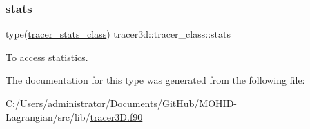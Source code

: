 \subsubsection{\texorpdfstring{stats}{stats}}
{\footnotesize\ttfamily type(\mbox{\hyperlink{structtracer3d_1_1tracer__stats__class}{tracer\+\_\+stats\+\_\+class}}) tracer3d\+::tracer\+\_\+class\+::stats\hspace{0.3cm}{\ttfamily [private]}}



To access statistics. 



The documentation for this type was generated from the following file\+:\begin{DoxyCompactItemize}
\item 
C\+:/\+Users/administrator/\+Documents/\+Git\+Hub/\+M\+O\+H\+I\+D-\/\+Lagrangian/src/lib/\mbox{\hyperlink{tracer3_d_8f90}{tracer3\+D.\+f90}}\end{DoxyCompactItemize}
